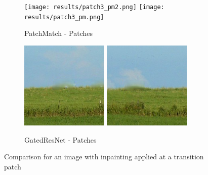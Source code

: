 \begin{figure}[ht]
    \begin{subfigure}[h]{0.49\textwidth}
        \centering
        \texttt{[image: results/patch3\_pm2.png]}
        \hspace*{0.5mm}
        \texttt{[image: results/patch3\_pm.png]}
        \caption{PatchMatch - Patches}
        \label{fig:pm-patch3}
    \end{subfigure}
    \hspace*{\fill}
    \begin{subfigure}[h]{0.49\textwidth}
        \centering
        \includegraphics[width=0.46\textwidth]{figures/results/patch3_result2.png}
        \hspace*{0.5mm}
        \includegraphics[width=0.46\textwidth]{figures/results/patch3_result.png}
        \caption{GatedResNet - Patches}
        \label{fig:inpainted-patch3}
    \end{subfigure}

    \caption{Comparison for an image with inpainting applied at a transition patch}
    \label{fig:inpainting3}
\end{figure}

